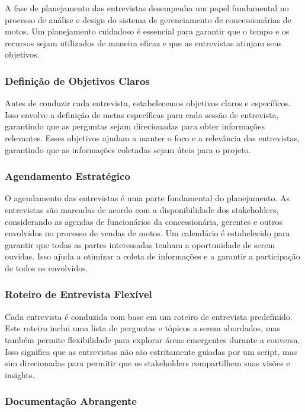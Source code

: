 A fase de planejamento das entrevistas desempenha um papel fundamental no processo de análise e design do sistema de gerenciamento de concessionárias de motos. Um planejamento cuidadoso é essencial para garantir que o tempo e os recursos sejam utilizados de maneira eficaz e que as entrevistas atinjam seus objetivos.

\subsubsection{Definição de Objetivos Claros}

Antes de conduzir cada entrevista, estabelecemos objetivos claros e específicos. Isso envolve a definição de metas específicas para cada sessão de entrevista, garantindo que as perguntas sejam direcionadas para obter informações relevantes. Esses objetivos ajudam a manter o foco e a relevância das entrevistas, garantindo que as informações coletadas sejam úteis para o projeto.

\subsubsection{Agendamento Estratégico}

O agendamento das entrevistas é uma parte fundamental do planejamento. As entrevistas são marcadas de acordo com a disponibilidade dos stakeholders, considerando as agendas de funcionários da concessionária, gerentes e outros envolvidos no processo de vendas de motos. Um calendário é estabelecido para garantir que todas as partes interessadas tenham a oportunidade de serem ouvidas. Isso ajuda a otimizar a coleta de informações e a garantir a participação de todos os envolvidos.

\subsubsection{Roteiro de Entrevista Flexível}

Cada entrevista é conduzida com base em um roteiro de entrevista predefinido. Este roteiro inclui uma lista de perguntas e tópicos a serem abordados, mas também permite flexibilidade para explorar áreas emergentes durante a conversa. Isso significa que as entrevistas não são estritamente guiadas por um script, mas sim direcionadas para permitir que os stakeholders compartilhem suas visões e insights.

\subsubsection{Documentação Abrangente}

